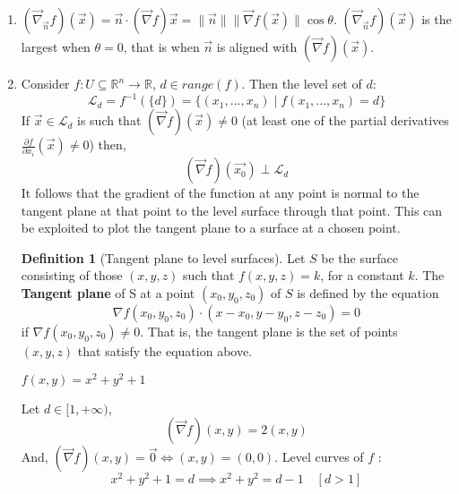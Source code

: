 \documentclass[12pt]{book}
\theoremstyle{definition}
\newtheorem{definition}{Definition}[section]
\theoremstyle{remark}
\begin{document}
      \begin{enumerate}
        \item $(\vec{{\nabla}}_{\vec{{n}}}f) (\vec{{x}}) = \vec{{n}} \cdot (\vec{{\nabla}} f) \vec{{x}} =\| \vec{{n}}\| \| \vec{{\nabla }}f(\vec{{x}})\| \cos \theta$. $(\vec{{\nabla}}_{\vec{{n}}}f) (\vec{{x}})$ is the largest when $\theta = 0$, that is when $\vec{{n}}$ is aligned with $(\vec{{\nabla}}f) (\vec{{x}} {})$.
        \item Consider $f: U \subseteq \mathbb{R}^n \rightarrow \mathbb{R}$, $d \in range(f)$. Then the level set of $d:$ $$\mathcal{L}_d = f^{-1}(\{d\}) = \{ (x_1, ..., x_n) \mid f(x_1,...,x_n) = d\} $$
         If $\vec{{x}} \in \mathcal{L}_d$ is such that $(\vec{{\nabla}}f) (\vec{{x}}) \neq 0$  (at least one of the partial derivatives $\frac{\partial {f}}{\partial {x_i}} (\vec{{x}}) \neq 0$) then, $$(\vec{{\nabla}}f)(\vec{{x_0}}) \perp \mathcal{L}_d $$
 It follows that the gradient of the function at any point is normal to the tangent plane at that point to the level surface through that point. This can be exploited to plot the tangent plane to a surface at a chosen point.
 \begin{definition}[Tangent plane to level surfaces]
   Let $S$ be the surface consisting of those $(x,y,z)$ such that $f(x,y,z) = k$, for a constant $k$. The \textbf{Tangent plane} of S at a point $(x_0, y_0, z_0)$ of $S$ is defined by the equation $${{\nabla}}f(x_0 , y_0, z_0 )\cdot (x-x_0, y-y_0, z-z_0) = 0$$ if $\nabla f(x_0, y_0, z_0) \neq 0.$ That is, the tangent plane is the set of points $(x,y,z)$ that satisfy the equation above.  
  
 \end{definition}
        \begin{example}
          $f(x,y) = x^2 + y^2 + 1$
          \newline 
          \begin{center}
          \end{center}
        Let $d \in [1, + \infty)$, 
          $$(\vec{{\nabla}} f) (x,y) = 2(x,y)  $$
          And, $(\vec{{\nabla}} f) (x,y) = \vec{{0}} \iff (x,y) = (0,0)$. Level curves of $f$ : 
          $$x^2 + y^2 +1 = d \implies x^2 + y^2 =d-1 \quad [d>1] $$


\end{example}
\end{enumerate}
\end{document}

